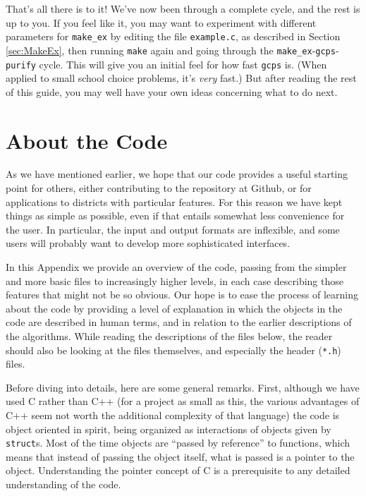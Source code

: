 \documentclass[12pt]{article}
\theoremstyle{definition}
\begin{document}
\begin{appendix}
That's all there is to it! We've now been through a complete cycle,
and the rest is up to you.  If you feel like it, you may want to
experiment with different parameters for \texttt{make\_ex} by editing
the file \texttt{example.c}, as described in Section \ref{sec:MakeEx},
then running \texttt{make} again and going through the
\texttt{make\_ex}-\texttt{gcps}- \texttt{purify} cycle.  This will
give you an initial feel for how fast \texttt{gcps} is.  (When applied
to small school choice problems, it's \textit{very} fast.)  But after
reading the rest of this guide, you may well have your own ideas
concerning what to do next.

\section{About the Code} \label{app:Code}

As we have mentioned earlier, we hope that our code provides a useful
starting point for others, either contributing to the repository at
Github, or for applications to districts with particular features.
For this reason we have kept things as simple as possible, even if
that entails somewhat less convenience for the user.  In particular,
the input and output formats are inflexible, and some users will
probably want to develop more sophisticated interfaces.

In this Appendix we provide an overview of the code, passing from the
simpler and more basic files to increasingly higher levels, in each
case describing those features that might not be so obvious.  Our hope
is to ease the process of learning about the code by providing a level
of explanation in which the objects in the code are described in human
terms, and in relation to the earlier descriptions of the algorithms.
While reading the descriptions of the files below, the reader should
also be looking at the files themselves, and especially the header
(\texttt{*.h}) files.

Before diving into details, here are some general remarks.  First,
although we have used C rather than C++ (for a project as small as
this, the various advantages of C++ seem not worth the additional
complexity of that language) the code is object oriented in spirit,
being organized as interactions of objects given by \texttt{struct}s.
Most of the time objects are ``passed by reference'' to functions,
which means that instead of passing the object itself, what is passed
is a pointer to the object.  Understanding the pointer concept of C is
a prerequisite to any detailed understanding of the code.


\end{appendix}
\end{document}
